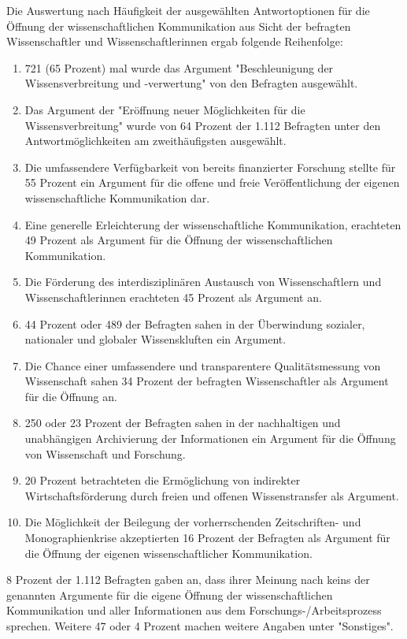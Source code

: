 Die Auswertung nach Häufigkeit der ausgewählten Antwortoptionen für die Öffnung der wissenschaftlichen Kommunikation aus Sicht der befragten Wissenschaftler und Wissenschaftlerinnen ergab folgende Reihenfolge:
\begin{enumerate}
\item 721 (65 Prozent) mal wurde das Argument "Beschleunigung der Wissensverbreitung und -verwertung" von den Befragten ausgewählt.
\item Das Argument der "Eröffnung neuer Möglichkeiten für die Wissensverbreitung" wurde von 64 Prozent der 1.112 Befragten unter den Antwortmöglichkeiten am zweithäufigsten ausgewählt.
\item Die umfassendere Verfügbarkeit von bereits finanzierter Forschung stellte für 55 Prozent ein Argument für die offene und freie Veröffentlichung der eigenen wissenschaftliche Kommunikation dar.
\item Eine generelle Erleichterung der wissenschaftliche Kommunikation, erachteten 49 Prozent als Argument für die Öffnung der wissenschaftlichen Kommunikation.
\item Die Förderung des interdisziplinären Austausch von Wissenschaftlern und Wissenschaftlerinnen erachteten 45 Prozent als Argument an.
\item 44 Prozent oder 489 der Befragten sahen in der Überwindung sozialer, nationaler und globaler Wissenskluften ein Argument.
\item Die Chance einer umfassendere und transparentere Qualitätsmessung von Wissenschaft sahen 34 Prozent der befragten Wissenschaftler als Argument für die Öffnung an.
\item 250 oder 23 Prozent der Befragten sahen in der nachhaltigen und unabhängigen Archivierung der Informationen ein Argument für die Öffnung von Wissenschaft und Forschung.
\item 20 Prozent betrachteten die Ermöglichung von indirekter Wirtschaftsförderung durch freien und offenen Wissenstransfer als Argument.
\item Die Möglichkeit der Beilegung der vorherrschenden Zeitschriften- und Monographienkrise akzeptierten 16 Prozent der Befragten als Argument für die Öffnung der eigenen wissenschaftlicher Kommunikation.
\end{enumerate}

8 Prozent der 1.112 Befragten gaben an, dass ihrer Meinung nach keins der genannten Argumente für die eigene Öffnung der wissenschaftlichen Kommunikation und aller Informationen aus dem Forschungs-/Arbeitsprozess sprechen. Weitere 47 oder 4 Prozent machen weitere Angaben unter "Sonstiges".

